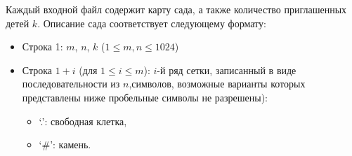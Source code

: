 Каждый входной файл содержит карту сада, а также количество приглашенных детей $k$. Описание сада соответствует следующему формату:
\begin{itemize}
\item Строка 1: $m$, $n$, $k$ ($1 \leq m, n \leq 1024$)
\item Строка $1 + i$ (для $1 \le i \le m$): $i$-й ряд сетки, записанный в виде последовательности из $n$,символов, возможные варианты которых представлены ниже пробельные символы не разрешены):
\begin{itemize}
\item `.': свободная клетка,
\item `\#': камень.
\end{itemize}
\end{itemize}